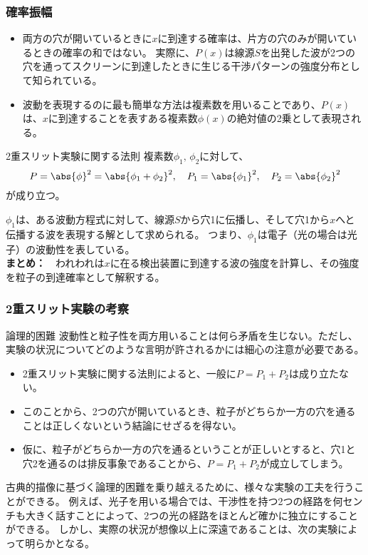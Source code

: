 \documentclass[10pt,aspectratio=169,xcolor=dvipsnames,table,dvipdfmx]{beamer}
\begin{document}
\begin{frame}
  \frametitle{確率振幅}
  \begin{itemize}
    \item   両方の穴が開いているときに$x$に到達する確率は、片方の穴のみが開いているときの確率の和ではない。
    実際に、$P(x)$は線源$S$を出発した波が2つの穴を通ってスクリーンに到達したときに生じる干渉パターンの強度分布として知られている。
    \item 波動を表現するのに最も簡単な方法は複素数を用いることであり、$P(x)$は、$x$に到達することを表すある複素数$\phi(x)$の絶対値の2乗として表現される。
  \end{itemize}
  \begin{block}{2重スリット実験に関する法則}
    複素数$\phi_1,\,\phi_2$に対して、
    \begin{equation}
      P = \abs{\phi}^2 = \abs{\phi_1 + \phi_2}^2 ,\quad P_1 = \abs{\phi_1}^2 ,\quad P_2 = \abs{\phi_2}^2
    \end{equation}
    が成り立つ。
  \end{block}
  $\phi_1$は、ある波動方程式に対して、線源$S$から穴1に伝播し、そして穴1から$x$へと伝播する波を表現する解として求められる。
  つまり、$\phi_1$は電子（光の場合は光子）の波動性を表している。\\
  \textbf{まとめ：　}\color{red}われわれは$x$に在る検出装置に到達する波の強度を計算し、その強度を粒子の到達確率として解釈する。
\end{frame}

\begin{frame}
  \frametitle{2重スリット実験の考察}
  \begin{block}{論理的困難}
    波動性と粒子性を両方用いることは何ら矛盾を生じない。ただし、実験の状況についてどのような言明が許されるかには細心の注意が必要である。
\begin{itemize}
  \item 2重スリット実験に関する法則によると、一般に$P=P_1+P_2$は成り立たない。
  \item このことから、2つの穴が開いているとき、粒子がどちらか一方の穴を通ることは正しくないという結論にせざるを得ない。
  \item 仮に、粒子がどちらか一方の穴を通るということが正しいとすると、穴1と穴2を通るのは排反事象であることから、$P=P_1+P_2$が成立してしまう。
\end{itemize}
  \end{block}
古典的描像に基づく論理的困難を乗り越えるために、様々な実験の工夫を行うことができる。
例えば、光子を用いる場合では、干渉性を持つ2つの経路を何センチも大きく話すことによって、2つの光の経路をほとんど確かに独立にすることができる。
しかし、実際の状況が想像以上に深遠であることは、次の実験によって明らかとなる。
\end{frame}
\end{document}
